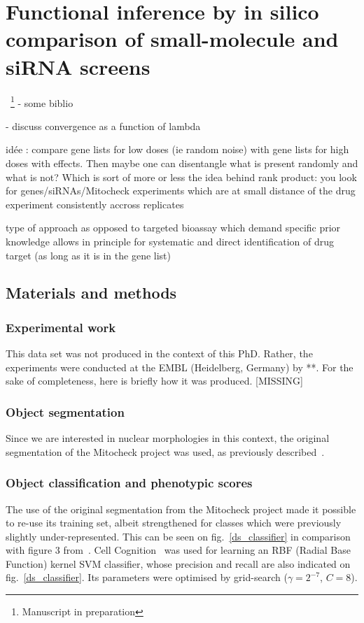 \section{Functional inference by in silico comparison of small-molecule and siRNA screens}
~\footnote{Manuscript in preparation}
- some biblio ~\cite{pmid20418956}

- discuss convergence as a function of lambda

idée : compare gene lists for low doses (ie random noise) with gene lists for high doses with effects. Then maybe one can disentangle what is present randomly and what is not? Which is sort of more or less the idea behind rank product: you look for genes/siRNAs/Mitocheck experiments which are at small distance of the drug experiment consistently accross replicates

type of approach as opposed to targeted bioassay which demand specific prior knowledge allows in principle for systematic and direct identification of drug target (as long as it is in the gene list)

\subsection{Materials and methods}
\subsubsection{Experimental work}
This data set was not produced in the context of this PhD. Rather, the experiments were conducted at the EMBL (Heidelberg, Germany) by **. For the sake of completeness, here is briefly how it was produced. [MISSING]
\subsubsection{Object segmentation}
\label{sec:ds_seg}
Since we are interested in nuclear morphologies in this context, the original segmentation of the Mitocheck project was used, as previously described~\cite{Walter2010}.

\subsubsection{Object classification and phenotypic scores}
\label{sec:ps}
The use of the original segmentation from the Mitocheck project made it possible to re-use its training set, albeit strengthened for classes which were previously slightly under-represented. This can be seen on fig.~\ref{ds_classifier} in comparison with figure 3 from~\cite{Walter2010}. Cell Cognition~\cite{cellcognition} was used for learning an RBF (Radial Base Function) kernel SVM classifier, whose precision and recall are also indicated on fig.~\ref{ds_classifier}. Its parameters were optimised by grid-search ($\gamma=2^{-7}$, $C=8$).

